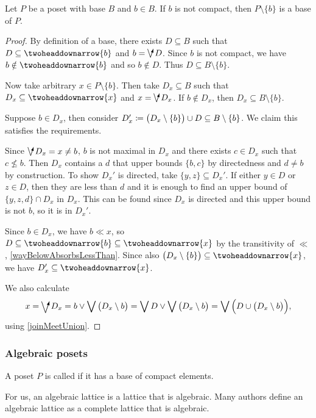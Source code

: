 \begin{proposition} \label{finiteRemovalNonCompactElementsFromBase}
Let $P$ be a poset with base $B$ and $b\in B$. If $b$ is not compact, then $P\setminus\{b\}$ is a base of $P$.
\end{proposition}
\begin{proof}
By definition of a base, there exists $D\subseteq B$ such that $D\subseteq \ddownset\{b\}$ and $b = \dirvee D$. Since $b$ is not compact, we have $b \notin \ddownset\{b\}$ and so $b\notin D$. Thus $D\subseteq B\setminus\{b\}$.

Now take arbitrary $x\in P\setminus\{b\}$. Then take $D_x \subseteq B$ such that $D_x\subseteq \ddownset\{x\}$ and $x = \dirvee D_x$. If $b\notin D_x$, then $D_x\subseteq B\setminus \{b\}$.

Suppose $b\in D_x$, then consider $D_x'\coloneqq \big(D_x\setminus \{b\}\big)\cup D \subseteq B\setminus \{b\}$. We claim this satisfies the requirements.

Since $\dirvee D_x = x \neq b$, $b$ is not maximal in $D_x$ and there exists $c\in D_x$ such that $c\nleq b$. Then $D_x$ contains a $d$ that upper bounds $\{b,c\}$ by directedness and $d\neq b$ by construction.
To show $D_x'$ is directed, take $\{y,z\}\subseteq D_x'$. If either $y\in D$ or $z\in D$, then they are less than $d$ and it is enough to find an upper bound of $\{y,z,d\}\cap D_x$ in $D_x$. This can be found since $D_x$ is directed and this upper bound is not $b$, so it is in $D_x'$.

Since $b\in D_x$, we have $b \ll x$, so $D\subseteq \ddownset\{b\} \subseteq \ddownset\{x\}$ by the transitivity of $\ll$, \ref{wayBelowAbsorbsLessThan}. Since also $\big(D_x\setminus \{b\}\big) \subseteq \ddownset\{x\}$, we have $D_x'\subseteq \ddownset\{x\}$.

We also calculate
\[ x = \dirvee D_x = b \vee \bigvee \big(D_x\setminus b\big) = \bigvee D \vee \bigvee \big(D_x\setminus b\big) = \bigvee \Big(D \cup \big(D_x\setminus b\big)\Big), \]
using \ref{joinMeetUnion}.
\end{proof}


\subsubsection{Algebraic posets}
\begin{definition}
A poset $P$ is called  if it has a base of compact elements.
\end{definition}
For us, an algebraic lattice is a lattice that is algebraic. Many authors define an algebraic lattice as a complete lattice that is algebraic.

